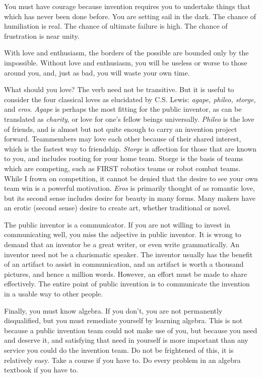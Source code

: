 \documentclass[
	fontsize=10pt, %
	twoside=false, %
	secnumdepth=1, %
]{kaobook}
\begin{document}
You must have courage because invention requires you
to undertake things that
which has never been done before.
You are setting sail in the dark.
The chance of humiliation is real.
The chance of ultimate failure is high.
The chance of frustration is near unity.

With love and enthusiasm, the borders of the
possible are bounded only by the impossible.
Without love and enthusiasm, you will be useless
or worse to those around you, and, just as bad,
you will waste your own time.

What should you love? The verb need not be
transitive. But it is useful to consider
the four classical loves as elucidated by C.S. Lewis:
{\em agape, phileo, storge,} and {\em eros}.\cite{Lewis1960}
{\em Agape} is perhaps the most fitting for
the public inventor, as can be translated as {\em charity},
or love for one's fellow beings universally.
{\em Phileo} is the love of friends, and
is almost but not quite enough to carry an invention project forward.
Teammembers may love each other because of their
shared interest, which is the fastest way to friendship.
{\em Storge} is affection for those that are known to you,
and includes rooting for your home team.
Storge is the basis of teams which are competing, such
as FIRST robotics teams or robot combat teams.
While I frown on competition, it cannot be denied that
the desire to see your own team win is a powerful motivation.
{\em Eros} is primarily thought of as romantic love, but
its second sense includes desire for beauty in many forms.
Many makers have an erotic (second sense) desire
to create art, whether traditional or novel.

The public inventor is a communicator.
If you are not willing to invest in communicating well,
you miss the adjective in public inventor.
It is wrong to demand that an inventor be a great writer,
or even write grammatically.
An inventor need not be a charismatic speaker.
The inventor usually has the benefit of an artifact to assist
in communication, and an artifact is worth a thousand pictures,
and hence a million words.
However, an effort must be made to share effectively.
The entire point of public invention is to communicate the invention
in a usable way to other people.

Finally, you must know algebra.
If you don't, you are not permanently disqualified,
but you must remediate yourself by learning algebra.
This is not because a public invention team could not make
use of you, but because you need and deserve it, and
satisfying that need in yourself is more important than
any service you could do the invention team.
Do not be frightened of this, it is relatively easy.
Take a course if you have to.
Do every problem in an algebra textbook if you have to.\cite{Moses2001}
\end{document}
